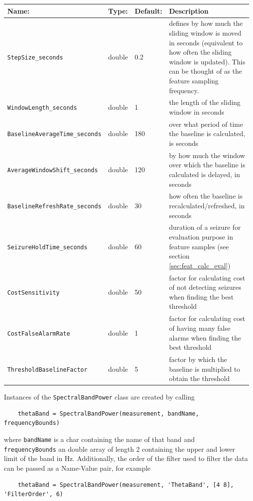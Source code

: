 \documentclass[usletter, 11pt]{extarticle}
\begin{document}
\begin{center}
	\begin{longtable}{p{5.5cm}|p{1.5cm}|p{1.5cm}|p{7.5cm}}
	\textbf{Name:} & \textbf{Type:} & \textbf{Default:} & \textbf{Description} \\ \hline
	\texttt{StepSize\_seconds} & double & 0.2 & defines by how much the sliding window is moved in seconds (equivalent to how often the sliding window is updated). This can be thought of as the feature sampling frequency.\\
	\texttt{WindowLength\_seconds} & double & 1 & the length of the sliding window in seconds \\
	\texttt{BaselineAverageTime\_seconds} & double & 180 & over what period of time the baseline is calculated, is seconds \\
	\texttt{AverageWindowShift\_seconds} & double & 120 & by how much the window over which the baseline is calculated is delayed, in seconds \\
	\texttt{BaselineRefreshRate\_seconds} & double & 30 & how often the baseline is recalculated/refreshed, in seconds \\
	\texttt{SeizureHoldTime\_seconds} & double & 60 & duration of a seizure for evaluation purpose in feature samples (see section \ref{sec:feat_calc_eval}) \\
	\texttt{CostSensitivity} & double & 50 & factor for calculating cost of not detecting seizures when finding the best threshold \\
	\texttt{CostFalseAlarmRate} & double & 1 & factor for calculating cost of having many false alarms when finding the best threshold \\
	\texttt{ThresholdBaselineFactor} & double & 5 & factor by which the baseline is multiplied to obtain the threshold	
\end{longtable}
\end{center}

Instances of the \verb|SpectralBandPower| class are created by calling
\begin{Verbatim}
	thetaBand = SpectralBandPower(measurement, bandName, frequencyBounds)
\end{Verbatim}
where \verb|bandName| is a char containing the name of that band and \verb|frequencyBounds| an double array of length 2 containing the upper and lower limit of the band in Hz. Additionally, the order of the filter used to filter the data can be passed as a Name-Value pair, for example
\begin{Verbatim}
	thetaBand = SpectralBandPower(measurement, 'ThetaBand', [4 8], 'FilterOrder', 6)
\end{Verbatim}
\end{document}
